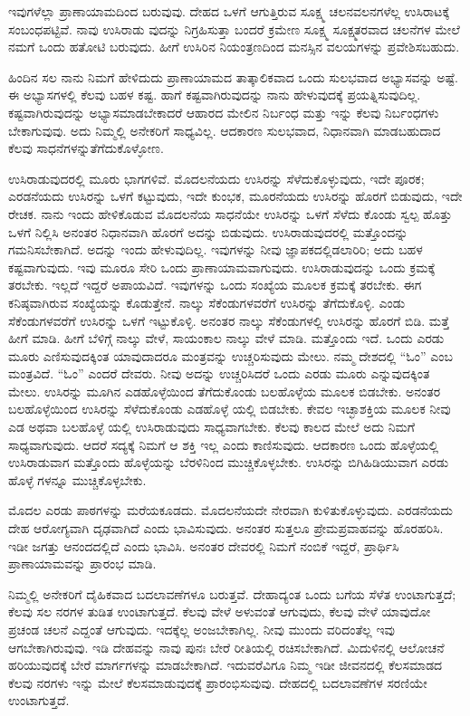 ಇವುಗಳೆಲ್ಲಾ ಪ್ರಾಣಾಯಾಮದಿಂದ ಬರುವುವು. ದೇಹದ ಒಳಗೆ ಆಗುತ್ತಿರುವ ಸೂಕ್ಷ್ಮ ಚಲನವಲನಗಳೆಲ್ಲ ಉಸಿರಾಟಕ್ಕೆ ಸಂಬಂಧಪಟ್ಟಿವೆ. ನಾವು ಉಸಿರಾಡು ವುದನ್ನು ನಿಗ್ರಹಿಸುತ್ತಾ ಬಂದರೆ ಕ್ರಮೇಣ ಸೂಕ್ಷ್ಮ ಸೂಕ್ಷ್ಮತರವಾದ ಚಲನೆಗಳ ಮೇಲೆ ನಮಗೆ ಒಂದು ಹತೋಟಿ ಬರುವುದು. ಹೀಗೆ ಉಸಿರಿನ ನಿಯಂತ್ರಣದಿಂದ ಮನಸ್ಸಿನ ವಲಯಗಳನ್ನು ಪ್ರವೇಶಿಸಬಹುದು.

ಹಿಂದಿನ ಸಲ ನಾನು ನಿಮಗೆ ಹೇಳಿದುದು ಪ್ರಾಣಾಯಾಮದ ತಾತ್ಕಾಲಿಕವಾದ ಒಂದು ಸುಲಭವಾದ ಅಭ್ಯಾಸವನ್ನು ಅಷ್ಟೆ. ಈ ಅಭ್ಯಾಸಗಳಲ್ಲಿ ಕೆಲವು ಬಹಳ ಕಷ್ಟ. ಹಾಗೆ ಕಷ್ಟವಾಗಿರುವುದನ್ನು ನಾನು ಹೇಳುವುದಕ್ಕೆ ಪ್ರಯತ್ನಿಸುವುದಿಲ್ಲ. ಕಷ್ಟವಾಗಿರುವುದನ್ನು ಅಭ್ಯಾಸಮಾಡಬೇಕಾದರೆ ಆಹಾರದ ಮೇಲಿನ ನಿರ್ಬಂಧ ಮತ್ತು ಇನ್ನು ಕೆಲವು ನಿರ್ಬಂಧಗಳು ಬೇಕಾಗುವುವು. ಅದು ನಿಮ್ಮಲ್ಲಿ ಅನೇಕರಿಗೆ ಸಾಧ್ಯವಿಲ್ಲ. ಆದಕಾರಣ ಸುಲಭವಾದ, ನಿಧಾನವಾಗಿ ಮಾಡಬಹುದಾದ ಕೆಲವು ಸಾಧನೆಗಳನ್ನುತೆಗೆದುಕೊಳ್ಳೋಣ.

ಉಸಿರಾಡುವುದರಲ್ಲಿ ಮೂರು ಭಾಗಗಳಿವೆ. ಮೊದಲನೆಯದು ಉಸಿರನ್ನು ಸೆಳೆದುಕೊಳ್ಳುವುದು, ಇದೇ ಪೂರಕ; ಎರಡನೆಯದು ಉಸಿರನ್ನು ಒಳಗೆ ಕಟ್ಟುವುದು, ಇದೇ ಕುಂಭಕ, ಮೂರನೆಯದು ಉಸಿರನ್ನು ಹೊರಗೆ ಬಿಡುವುದು, ಇದೇ ರೇಚಕ. ನಾನು ಇಂದು ಹೇಳಿಕೊಡುವ ಮೊದಲನೆಯ ಸಾಧನೆಯೇ ಉಸಿರನ್ನು ಒಳಗೆ ಸೆಳೆದು ಕೊಂಡು ಸ್ವಲ್ಪ ಹೊತ್ತು ಒಳಗೆ ನಿಲ್ಲಿಸಿ ಅನಂತರ ನಿಧಾನವಾಗಿ ಹೊರಗೆ ಅದನ್ನು ಬಿಡುವುದು. ಉಸಿರಾಡುವುದರಲ್ಲಿ ಮತ್ತೊಂದನ್ನು ಗಮನಿಸಬೇಕಾಗಿದೆ. ಅದನ್ನು ಇಂದು ಹೇಳುವುದಿಲ್ಲ. ಇವುಗಳನ್ನು ನೀವು ಜ್ಞಾಪಕದಲ್ಲಿಡಲಾರಿರಿ; ಅದು ಬಹಳ ಕಷ್ಟವಾಗುವುದು. ಇವು ಮೂರೂ ಸೇರಿ ಒಂದು ಪ್ರಾಣಾಯಾಮವಾಗುವುದು. ಉಸಿರಾಡುವುದನ್ನು ಒಂದು ಕ್ರಮಕ್ಕೆ ತರಬೇಕು. ಇಲ್ಲದೆ ಇದ್ದರೆ ಅಪಾಯವಿದೆ. ಇವುಗಳನ್ನು ಒಂದು ಸಂಖ್ಯೆಯ ಮೂಲಕ ಕ್ರಮಕ್ಕೆ ತರಬೇಕು. ಈಗ ಕನಿಷ್ಠವಾಗಿರುವ ಸಂಖ್ಯೆಯನ್ನು ಕೊಡುತ್ತೇನೆ. ನಾಲ್ಕು ಸೆಕೆಂಡುಗಳವರೆಗೆ ಉಸಿರನ್ನು ತೆಗೆದುಕೊಳ್ಳಿ. ಎಂಡು ಸೆಕೆಂಡುಗಳವರೆಗೆ ಉಸಿರನ್ನು ಒಳಗೆ ಇಟ್ಟುಕೊಳ್ಳಿ. ಅನಂತರ ನಾಲ್ಕು ಸೆಕೆಂಡುಗಳಲ್ಲಿ ಉಸಿರನ್ನು ಹೊರಗೆ ಬಿಡಿ. ಮತ್ತೆ ಹೀಗೆ ಮಾಡಿ. ಹೀಗೆ ಬೆಳಿಗ್ಗೆ ನಾಲ್ಕು ವೇಳೆ, ಸಾಯಂಕಾಲ ನಾಲ್ಕು ವೇಳೆ ಮಾಡಿ. ಮತ್ತೊಂದು ಇದೆ. ಒಂದು ಎರಡು ಮೂರು ಎಣಿಸುವುದಕ್ಕಿಂತ ಯಾವುದಾದರೂ ಮಂತ್ರವನ್ನು ಉಚ್ಚರಿಸುವುದು ಮೇಲು. ನಮ್ಮ ದೇಶದಲ್ಲಿ “ಓಂ” ಎಂಬ ಮಂತ್ರವಿದೆ. “ಓಂ” ಎಂದರೆ ದೇವರು. ನೀವು ಅದನ್ನು ಉಚ್ಚರಿಸಿದರೆ ಒಂದು ಎರಡು ಮೂರು ಎನ್ನುವುದಕ್ಕಿಂತ ಮೇಲು. ಉಸಿರನ್ನು ಮೂಗಿನ ಎಡಹೊಳ್ಳೆಯಿಂದ ತೆಗೆದುಕೊಂಡು ಬಲಹೊಳ್ಳೆಯ ಮೂಲಕ ಬಿಡಬೇಕು. ಅನಂತರ ಬಲಹೊಳ್ಳೆಯಿಂದ ಉಸಿರನ್ನು ಸೆಳೆದುಕೊಂಡು ಎಡಹೊಳ್ಳೆ ಯಲ್ಲಿ ಬಿಡಬೇಕು. ಕೇವಲ ಇಚ್ಛಾಶಕ್ತಿಯ ಮೂಲಕ ನೀವು ಎಡ ಅಥವಾ ಬಲಹೊಳ್ಳೆ ಯಲ್ಲಿ ಉಸಿರಾಡುವುದು ಸಾಧ್ಯವಾಗಬೇಕು. ಕೆಲವು ಕಾಲದ ಮೇಲೆ ಅದು ನಿಮಗೆ ಸಾಧ್ಯವಾಗುವುದು. ಆದರೆ ಸದ್ಯಕ್ಕೆ ನಿಮಗೆ ಆ ಶಕ್ತಿ ಇಲ್ಲ ಎಂದು ಕಾಣಿಸುವುದು. ಆದಕಾರಣ ಒಂದು ಹೊಳ್ಳೆಯಲ್ಲಿ ಉಸಿರಾಡುವಾಗ ಮತ್ತೊಂದು ಹೊಳ್ಳೆಯನ್ನು ಬೆರಳಿನಿಂದ ಮುಚ್ಚಿಕೊಳ್ಳಬೇಕು. ಉಸಿರನ್ನು ಬಿಗಿಹಿಡಿಯುವಾಗ ಎರಡು ಹೊಳ್ಳೆ ಗಳನ್ನೂ ಮುಚ್ಚಿಕೊಳ್ಳಬೇಕು.

ಮೊದಲ ಎರಡು ಪಾಠಗಳನ್ನು ಮರೆಯಕೂಡದು. ಮೊದಲನೆಯದೇ ನೇರವಾಗಿ ಕುಳಿತುಕೊಳ್ಳುವುದು. ಎರಡನೆಯದು ದೇಹ ಆರೋಗ್ಯವಾಗಿ ದೃಢವಾಗಿದೆ ಎಂದು ಭಾವಿಸುವುದು. ಅನಂತರ ಸುತ್ತಲೂ ಪ್ರೇಮಪ್ರವಾಹವನ್ನು ಹೊರಹರಿಸಿ. ಇಡೀ ಜಗತ್ತು ಆನಂದದಲ್ಲಿದೆ ಎಂದು ಭಾವಿಸಿ. ಅನಂತರ ದೇವರಲ್ಲಿ ನಿಮಗೆ ನಂಬಿಕೆ ಇದ್ದರೆ, ಪ್ರಾರ್ಥಿಸಿ ಪ್ರಾಣಾಯಾಮವನ್ನು ಪ್ರಾರಂಭ ಮಾಡಿ.

ನಿಮ್ಮಲ್ಲಿ ಅನೇಕರಿಗೆ ದೈಹಿಕವಾದ ಬದಲಾವಣೆಗಳೂ ಬರುತ್ತವೆ. ದೇಹಾದ್ಯಂತ ಒಂದು ಬಗೆಯ ಸೆಳೆತ ಉಂಟಾಗುತ್ತದೆ; ಕೆಲವು ಸಲ ನರಗಳ ತುಡಿತ ಉಂಟಾಗುತ್ತದೆ. ಕೆಲವು ವೇಳೆ ಅಳುವಂತೆ ಆಗುವುದು, ಕೆಲವು ವೇಳೆ ಯಾವುದೋ ಪ್ರಚಂಡ ಚಲನೆ ಎದ್ದಂತೆ ಆಗುವುದು. ಇದಕ್ಕೆಲ್ಲ ಅಂಜಬೇಕಾಗಿಲ್ಲ. ನೀವು ಮುಂದು ವರಿದಂತೆಲ್ಲ ಇವು ಆಗಬೇಕಾಗಿರುವುವು. ಇಡಿ ದೇಹವನ್ನು ನಾವು ಪುನಃ ಬೇರೆ ರೀತಿಯಲ್ಲಿ ರಚಿಸಬೇಕಾಗಿದೆ. ಮಿದುಳಿನಲ್ಲಿ ಆಲೋಚನೆ ಹರಿಯುವುದಕ್ಕೆ ಬೇರೆ ಮಾರ್ಗಗಳನ್ನು ಮಾಡಬೇಕಾಗಿದೆ. ಇದುವರೆವಿಗೂ ನಿಮ್ಮ ಇಡೀ ಜೀವನದಲ್ಲಿ ಕೆಲಸಮಾಡದ ಕೆಲವು ನರಗಳು ಇನ್ನು ಮೇಲೆ ಕೆಲಸಮಾಡುವುದಕ್ಕೆ ಪ್ರಾರಂಭಿಸುವುವು. ದೇಹದಲ್ಲಿ ಬದಲಾವಣೆಗಳ ಸರಣಿಯೇ ಉಂಟಾಗುತ್ತದೆ.

